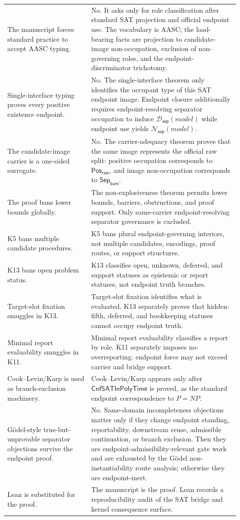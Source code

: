 \documentclass[11pt]{article}
\theoremstyle{definition}
\theoremstyle{remark}
\newcommand{\PosRaw}{\mathsf{Pos}_{\mathsf{raw}}}
\newcommand{\SepBare}{\mathsf{Sep}_{\mathsf{bare}}}
\newcommand{\CnfSATP}{\mathsf{CnfSATInPolyTime}}
\newcommand{\SepDisc}{\mathcal{D}_{\mathsf{sep}}}
\newcommand{\NoSepDisc}{\mathcal{N}_{\mathsf{sep}}}
\begin{document}
{\begin{longtable}{>{\raggedright\arraybackslash}p{0.34\linewidth}>{\raggedright\arraybackslash}p{0.60\linewidth}}
The manuscript forces standard practice to accept AASC typing. & No. It asks only for role classification after standard SAT projection and official endpoint use. The vocabulary is AASC; the load-bearing facts are projection to candidate-image non-occupation, exclusion of non-governing roles, and the endpoint-discriminator trichotomy. \\
Single-interface typing proves every positive existence endpoint. & No. The single-interface theorem only identifies the occupant type of this SAT endpoint image. Endpoint closure additionally requires endpoint-resolving separator occupation to induce \(\SepDisc(model)\) while endpoint use yields \(\NoSepDisc(model)\). \\
The candidate-image carrier is a one-sided surrogate. & No. The carrier-adequacy theorem proves that the same image represents the official raw split: positive occupation corresponds to \(\PosRaw\), and image non-occupation corresponds to \(\SepBare\). \\
The proof bans lower bounds globally. & The non-explosiveness theorem permits lower bounds, barriers, obstructions, and proof support. Only same-carrier endpoint-resolving separator governance is excluded. \\
K5 bans multiple candidate procedures. & K5 bans plural endpoint-governing interiors, not multiple candidates, encodings, proof routes, or support structures. \\
K13 bans open problem status. & K13 classifies open, unknown, deferred, and support statuses as epistemic or report statuses, not endpoint truth branches. \\
Target-slot fixation smuggles in K13. & Target-slot fixation identifies what is evaluated. K13 separately proves that hidden-fifth, deferred, and bookkeeping statuses cannot occupy endpoint truth. \\
Minimal report evaluability smuggles in K11. & Minimal report evaluability classifies a report by role. K11 separately imposes no-overreporting: endpoint force may not exceed carrier and bridge support. \\
Cook--Levin/Karp is used as branch-exclusion machinery. & Cook--Levin/Karp appears only after \(\CnfSATP\) is proved, as the standard endpoint correspondence to \(P=NP\). \\
G\"odel-style true-but-unprovable separator objections survive the endpoint proof. & No. Same-domain incompleteness objections matter only if they change endpoint standing, reportability, downstream reuse, admissible continuation, or branch exclusion. Then they are endpoint-admissibility-relevant gate work and are exhausted by the G\"odel non-instantiability route analysis; otherwise they are endpoint-inert. \\
Lean is substituted for the proof. & The manuscript is the proof. Lean records a reproducibility audit of the SAT bridge and kernel consequence surface. \\
\bottomrule
\end{longtable}
}
\end{document}

